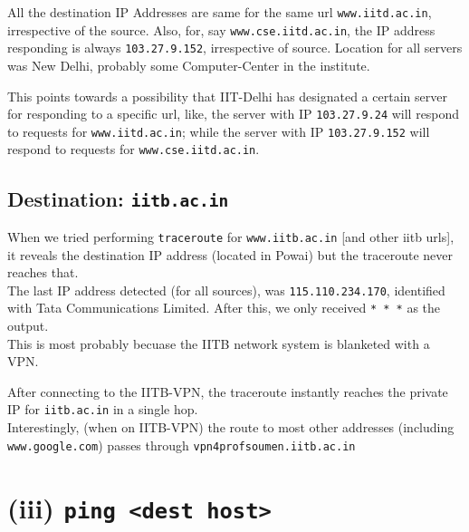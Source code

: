 \documentclass[11pt, fleqn]{article}
\begin{document}


\hrulefill
\medskip

All the destination IP Addresses are same for the same url \texttt{www.iitd.ac.in}, irrespective of the source. 
Also, for, say \texttt{www.cse.iitd.ac.in}, the IP address responding is always \texttt{103.27.9.152}, 
irrespective of source. Location for all servers was New Delhi, probably some Computer-Center in the institute.

This points towards a possibility that IIT-Delhi has designated a certain server
for responding to a specific url, like, the server with IP \texttt{103.27.9.24} will 
respond to requests for \texttt{www.iitd.ac.in}; while the server with IP 
\texttt{103.27.9.152} will respond to requests for \texttt{www.cse.iitd.ac.in}. 

\newpage
\subsection*{Destination: \texttt{iitb.ac.in}}

When we tried performing \texttt{traceroute} for \texttt{www.iitb.ac.in} 
[and other iitb urls], it reveals the destination IP address (located in Powai) but the traceroute never reaches that.\\
The last IP address detected (for all sources), 
was \texttt{115.110.234.170}, identified with Tata Communications Limited. After this, we only received \texttt{* * *} as the output.\\
This is most probably becuase the IITB network system is blanketed with a VPN.

\smallskip
After connecting to the IITB-VPN, the traceroute instantly reaches the private IP for \texttt{iitb.ac.in} in a single hop.\\
Interestingly, (when on IITB-VPN) the route to most other addresses (including \texttt{www.google.com}) passes 
through \texttt{vpn4profsoumen.iitb.ac.in}


\newpage
\section*{(iii) \texttt{ping <dest host>}}
\label{partc}
\setcounter{equation}{0}
\end{document}
